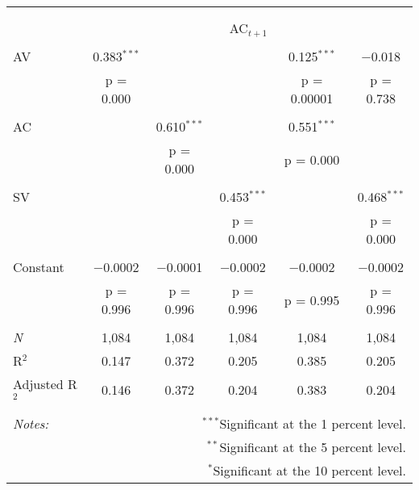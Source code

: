 
\begin{tabular}{@{\extracolsep{5pt}}lccccc} 
\\[-1.8ex]\hline 
\hline \\[-1.8ex] 
\\[-1.8ex] & \multicolumn{5}{c}{AC$_{t+1}$} \\ 
\hline \\[-1.8ex] 
 AV & 0.383$^{***}$ &  &  & 0.125$^{***}$ & $-$0.018 \\ 
  & p = 0.000 &  &  & p = 0.00001 & p = 0.738 \\ 
  & & & & & \\ 
 AC &  & 0.610$^{***}$ &  & 0.551$^{***}$ &  \\ 
  &  & p = 0.000 &  & p = 0.000 &  \\ 
  & & & & & \\ 
 SV &  &  & 0.453$^{***}$ &  & 0.468$^{***}$ \\ 
  &  &  & p = 0.000 &  & p = 0.000 \\ 
  & & & & & \\ 
 Constant & $-$0.0002 & $-$0.0001 & $-$0.0002 & $-$0.0002 & $-$0.0002 \\ 
  & p = 0.996 & p = 0.996 & p = 0.996 & p = 0.995 & p = 0.996 \\ 
  & & & & & \\ 
\textit{N} & 1,084 & 1,084 & 1,084 & 1,084 & 1,084 \\ 
R$^{2}$ & 0.147 & 0.372 & 0.205 & 0.385 & 0.205 \\ 
Adjusted R$^{2}$ & 0.146 & 0.372 & 0.204 & 0.383 & 0.204 \\ 
\hline 
\hline \\[-1.8ex] 
\textit{Notes:} & \multicolumn{5}{r}{$^{***}$Significant at the 1 percent level.} \\ 
 & \multicolumn{5}{r}{$^{**}$Significant at the 5 percent level.} \\ 
 & \multicolumn{5}{r}{$^{*}$Significant at the 10 percent level.} \\ 
\end{tabular} 
